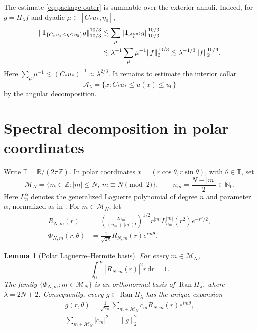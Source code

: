 \documentclass[10pt,a4paper]{amsart}
\newtheorem{lemma}[theorem]{Lemma}
\numberwithin{equation}{section}
\newcommand{\R}{\mathbb R}
\newcommand{\T}{\mathbb T}
\newcommand{\one}{\mathbf 1}
\newcommand{\dd}{\,\mathrm d}
\newcommand{\norm}[1]{\lVert #1\rVert}
\begin{document}
The estimate \eqref{eq:package-outer} is summable over the exterior annuli.
Indeed, for \(g=\Pi_\lambda f\) and dyadic
\(\mu\in[C_*u_*,\eta_0]\),
\begin{align}
 \norm{\one_{\{C_*u_*\le\eta\le\eta_0\}}g}_{10/3}^{10/3}
 &\lesssim\sum_\mu
 \norm{\one_{\mathcal A_\mu^{\rm out}}g}_{10/3}^{10/3}\notag\\
 &\lesssim\lambda^{-1}\sum_\mu\mu^{-1}\norm f_2^{10/3}
 \lesssim\lambda^{-1/3}\norm f_2^{10/3}.
 \label{eq:outer-sum}
\end{align}
Here
\(\sum_\mu\mu^{-1}\lesssim(C_*u_*)^{-1}\approx\lambda^{2/3}\).
It remains to estimate the interior collar
\[
 \mathcal A_\lambda=\{x:C_*u_*\le u(x)\le u_0\}
\]
by the angular decomposition.

\section{Spectral decomposition in polar coordinates}\label{sec:polar}

Write \(\T=\R/(2\pi\mathbb Z)\). In polar coordinates
\(x=(r\cos\theta,r\sin\theta)\), with \(\theta\in\T\), set
\[
 \mathcal M_N=\{m\in\mathbb Z:|m|\le N,\ m\equiv N\pmod2\},
 \qquad
 n_m=\frac{N-|m|}{2}\in\mathbb N_0.
\]
Here \(L_n^\alpha\) denotes the generalized Laguerre polynomial of degree \(n\)
and parameter \(\alpha\), normalized as in
\cite[(1.1.37)]{Thangavelu}. For \(m\in\mathcal M_N\), let
\begin{equation}\label{eq:radial-laguerre}
 \begin{split}
  R_{N,m}(r)&=
  \left(\frac{2n_m!}{(n_m+|m|)!}\right)^{1/2}
  r^{|m|}L_{n_m}^{|m|}(r^2)e^{-r^2/2},\\
  \Phi_{N,m}(r,\theta)&=\frac1{\sqrt{2\pi}}R_{N,m}(r)e^{im\theta}.
 \end{split}
\end{equation}

\begin{lemma}[Polar Laguerre--Hermite basis]\label{lem:polar-basis}
For every \(m\in\mathcal M_N\),
\[
 \int_0^\infty|R_{N,m}(r)|^2r\dd r=1.
\]
The family
\(\{\Phi_{N,m}:m\in\mathcal M_N\}\) is an orthonormal basis of
\(\operatorname{Ran}\Pi_\lambda\), where
\(\lambda=2N+2\). Consequently, every
\(g\in\operatorname{Ran}\Pi_\lambda\) has the unique expansion
\begin{equation}\label{eq:polar-expansion}
 \begin{gathered}
  g(r,\theta)=\frac1{\sqrt{2\pi}}
  \sum_{m\in\mathcal M_N}c_mR_{N,m}(r)e^{im\theta},\\
  \sum_{m\in\mathcal M_N}|c_m|^2=\norm g_2^2.
 \end{gathered}
\end{equation}
\end{lemma}
\end{document}

